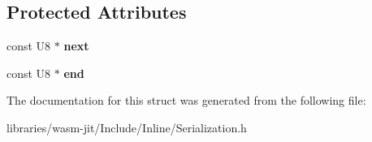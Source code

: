 \subsection*{Protected Attributes}
\begin{DoxyCompactItemize}
\item 
\mbox{\label{struct_serialization_1_1_input_stream_a3b710216e24ed9386dcf28ead395ef0d}} 
const U8 $\ast$ {\bfseries next}
\item 
\mbox{\label{struct_serialization_1_1_input_stream_ac94b47818b240805db6babfe91814000}} 
const U8 $\ast$ {\bfseries end}
\end{DoxyCompactItemize}


The documentation for this struct was generated from the following file\+:\begin{DoxyCompactItemize}
\item 
libraries/wasm-\/jit/\+Include/\+Inline/Serialization.\+h\end{DoxyCompactItemize}
